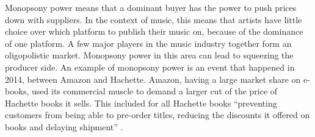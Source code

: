 
Monopsony power means that a dominant buyer has the power to push prices down with suppliers. In the context of music, this means that artists have little choice over which platform to publish their music on, because of the dominance of one platform. A few major players in the music industry together form an oligopolistic market. Monopsony power in this area can lead to squeezing the producer side. 
An example of monopsony power is an event that happened in 2014, between Amazon and Hachette. Amazon, having a large market share on e-books, used its commercial muscle to demand a larger cut of the price of Hachette books it sells. This included for all Hachette books ``preventing customers from being able to pre-order titles, reducing the discounts it offered on books and delaying shipment'' \citep{theguardian2014amazon}. 

